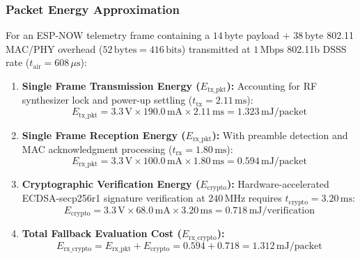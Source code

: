 \subsubsection{Packet Energy Approximation}
For an ESP-NOW telemetry frame containing a $14\,\text{byte}$ payload + $38\,\text{byte}$ 802.11 MAC/PHY overhead ($52\,\text{bytes} = 416\,\text{bits}$) transmitted at $1\,\text{Mbps}$ 802.11b DSSS rate ($t_{\text{air}} = 608\,\mu\text{s}$):
\begin{enumerate}
    \item \textbf{Single Frame Transmission Energy ($E_{\text{tx\_pkt}}$):} Accounting for RF synthesizer lock and power-up settling ($t_{\text{tx}} = 2.11\,\text{ms}$):
    \begin{equation}
        E_{\text{tx\_pkt}} = 3.3\,\text{V} \times 190.0\,\text{mA} \times 2.11\,\text{ms} = 1.323\,\text{mJ/packet}
    \end{equation}
    \item \textbf{Single Frame Reception Energy ($E_{\text{rx\_pkt}}$):} With preamble detection and MAC acknowledgment processing ($t_{\text{rx}} = 1.80\,\text{ms}$):
    \begin{equation}
        E_{\text{rx\_pkt}} = 3.3\,\text{V} \times 100.0\,\text{mA} \times 1.80\,\text{ms} = 0.594\,\text{mJ/packet}
    \end{equation}
    \item \textbf{Cryptographic Verification Energy ($E_{\text{crypto}}$):} Hardware-accelerated ECDSA-secp256r1 signature verification at $240\,\text{MHz}$ requires $t_{\text{crypto}} = 3.20\,\text{ms}$:
    \begin{equation}
        E_{\text{crypto}} = 3.3\,\text{V} \times 68.0\,\text{mA} \times 3.20\,\text{ms} = 0.718\,\text{mJ/verification}
    \end{equation}
    \item \textbf{Total Fallback Evaluation Cost ($E_{\text{rx\_crypto}}$):}
    \begin{equation}
        E_{\text{rx\_crypto}} = E_{\text{rx\_pkt}} + E_{\text{crypto}} = 0.594 + 0.718 = 1.312\,\text{mJ/packet}
    \end{equation}
\end{enumerate}

